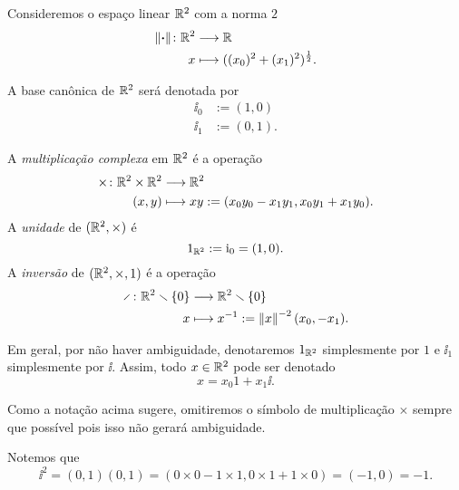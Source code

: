 Consideremos o espaço linear $\mathbb{R}^2$ com a norma $2$
	\begin{align*}
	{\left\Vert{\bm{\cdot}}\right\Vert}\colon {\mathbb{R}^2} &\longrightarrow {\mathbb{R}} \\{x} &\longmapsto ((x_0)^2 + (x_1)^2)^{\frac{1}{2}}.
	\end{align*}

A base canônica de $\mathbb{R}^2$ será denotada por
	\begin{align*}
	\ii_0 &:= (1,0) \\
	\ii_1 &:= (0,1) .
	\end{align*}

\begin{definition}
A \emph{multiplicação complexa} em $\mathbb{R}^2$ é a operação
	\begin{align*}
	{\times}\colon {\mathbb{R}^2 \times \mathbb{R}^2} &\longrightarrow {\mathbb{R}^2} \\{(x,y)} &\longmapsto xy := (x_0y_0-x_1y_1,x_0y_1+x_1y_0).
	\end{align*}
A \emph{unidade} de $(\mathbb{R}^2,\times)$ é
	\begin{equation*}
	1_{\mathbb{R}^2} := \mathrm{i}_0 = (1,0).
	\end{equation*}
A \emph{inversão} de $(\mathbb{R}^2,\times,1)$ é a operação
	\begin{align*}
	\func{\div}{\R^2 \setminus \{0\}}{\R^2 \setminus \{0\}}{x}{x\inv := \nor{x}^{-2}(x_0,-x_1)}.
	\end{align*}
\end{definition}

Em geral, por não haver ambiguidade, denotaremos $1_{\mathbb{R}^2}$ simplesmente por $1$ e $\ii_1$ simplesmente por $\ii$. Assim, todo $x \in \mathbb{R}^2$ pode ser denotado
	\begin{equation*}
	x = x_0 1 + x_1 \ii.
	\end{equation*}

Como a notação acima sugere, omitiremos o símbolo de multiplicação $\times$ sempre que possível pois isso não gerará ambiguidade.

Notemos que
	\begin{equation*}
	\ii^2 = (0,1)(0,1) = (0 \times 0 - 1 \times 1, 0 \times 1 + 1 \times 0) = (-1,0) = -1.
	\end{equation*}

